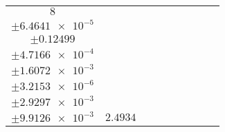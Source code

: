 \documentclass[8pt]{article}
\begin{document}
\begin{longtable}[l]{c c c c c c c c c}
$\num{8}$ & \begin{tabular}[c]{@{}c@{}}$\num{3.0108e-2}$ \\ $\pm\num{6.4641e-5}$\end{tabular} & \begin{tabular}[c]{@{}c@{}}$\num{0.30988}$ \\ $\pm\num{0.12499}$\end{tabular} & \begin{tabular}[c]{@{}c@{}}$\num{9.3676}$ \\ $\pm\num{4.7166e-4}$\end{tabular} & \begin{tabular}[c]{@{}c@{}}$\num{739.93}$ \\ $\pm\num{1.6072e-3}$\end{tabular} & \begin{tabular}[c]{@{}c@{}}$\num{1.4803}$ \\ $\pm\num{3.2153e-6}$\end{tabular} & \begin{tabular}[c]{@{}c@{}}$\num{1.1639}$ \\ $\pm\num{2.9297e-3}$\end{tabular} & \begin{tabular}[c]{@{}c@{}}$\num{4.2039}$ \\ $\pm\num{9.9126e-3}$\end{tabular} & $\num{2.4934}$\\
\bottomrule
\end{longtable}
\end{document}
